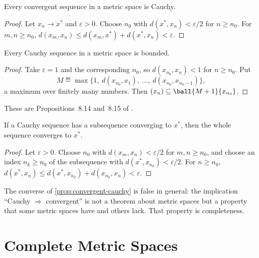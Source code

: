 \begin{proposition}\label{prop:convergent-cauchy}
	Every convergent sequence in a metric space is Cauchy.
\end{proposition}

\begin{proof}
	Let $x_n\to x^\ast$ and $\varepsilon>0$. Choose $n_0$ with
	$d(x^\ast,x_n)<\varepsilon/2$ for $n\geq n_0$. For $m,n\geq n_0$,
	$d(x_m,x_n)\leq d(x_m,x^\ast)+d(x^\ast,x_n)<\varepsilon$.
\end{proof}

\begin{proposition}\label{prop:cauchy-bounded}
	Every Cauchy sequence in a metric space is bounded.
\end{proposition}

\begin{proof}
	Take $\varepsilon=1$ and the corresponding $n_0$, so $d(x_{n_0},x_n)<1$ for
	$n\geq n_0$. Put
	\[
		M\eqdef\max\bigl\{1,\ d(x_{n_0},x_1),\ \dots,\ d(x_{n_0},x_{n_0-1})\bigr\},
	\]
	a maximum over finitely many numbers. Then $(x_n)\subseteq\ball{M+1}{x_{n_0}}$.
\end{proof}

These are Propositions~8.14 and~8.15 of \textcite{fukuda2026notes}
\autocite[slides 58--59]{fukuda2026analysis}.

\begin{lemma}\label{lem:cauchy-subseq}
	If a Cauchy sequence has a subsequence converging to $x^\ast$, then the whole
	sequence converges to $x^\ast$.
\end{lemma}

\begin{proof}
	Let $\varepsilon>0$. Choose $n_0$ with $d(x_m,x_n)<\varepsilon/2$ for
	$m,n\geq n_0$, and choose an index $n_k\geq n_0$ of the subsequence with
	$d(x^\ast,x_{n_k})<\varepsilon/2$. For $n\geq n_0$,
	$d(x^\ast,x_n)\leq d(x^\ast,x_{n_k})+d(x_{n_k},x_n)<\varepsilon$.
\end{proof}

The converse of \autoref{prop:convergent-cauchy} is false in general: the
implication ``Cauchy $\Rightarrow$ convergent'' is not a theorem about metric
spaces but a property that some metric spaces have and others lack. That
property is completeness.

\section{Complete Metric Spaces}\label{sec:comp-complete}

